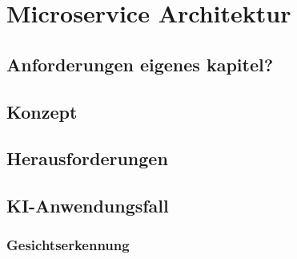 \chapter{Microservice Architektur}
\section{Anforderungen eigenes kapitel?}
\section{Konzept}
\section{Herausforderungen}
\section{KI-Anwendungsfall}
\subsection{Gesichtserkennung}